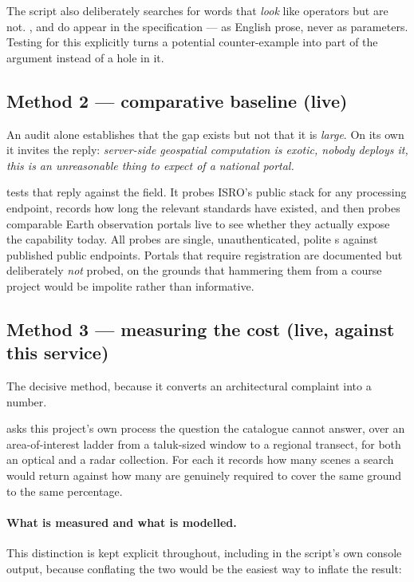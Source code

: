 The script also deliberately searches for words that \emph{look} like
operators but are not. ,  and  do
appear in the specification --- as English prose, never as parameters. Testing
for this explicitly turns a potential counter-example into part of the
argument instead of a hole in it.

\subsection{Method 2 --- comparative baseline (live)}

An audit alone establishes that the gap exists but not that it is
\emph{large}. On its own it invites the reply: \emph{server-side geospatial
computation is exotic, nobody deploys it, this is an unreasonable thing to
expect of a national portal.}

 tests that reply against the field. It
probes ISRO's public stack for any processing endpoint, records how long the
relevant standards have existed, and then probes comparable Earth observation
portals live to see whether they actually expose the capability today. All
probes are single, unauthenticated, polite s against published
public endpoints. Portals that require registration are documented but
deliberately \emph{not} probed, on the grounds that hammering them from a
course project would be impolite rather than informative.

\subsection{Method 3 --- measuring the cost (live, against this service)}

The decisive method, because it converts an architectural complaint into a
number.

 asks this project's own
 process the question the catalogue cannot answer,
over an area-of-interest ladder from a taluk-sized window to a regional
transect, for both an optical and a radar collection. For each it records how
many scenes a search would return against how many are genuinely required to
cover the same ground to the same percentage.

\paragraph{What is measured and what is modelled.} This distinction is kept
explicit throughout, including in the script's own console output, because
conflating the two would be the easiest way to inflate the result:

